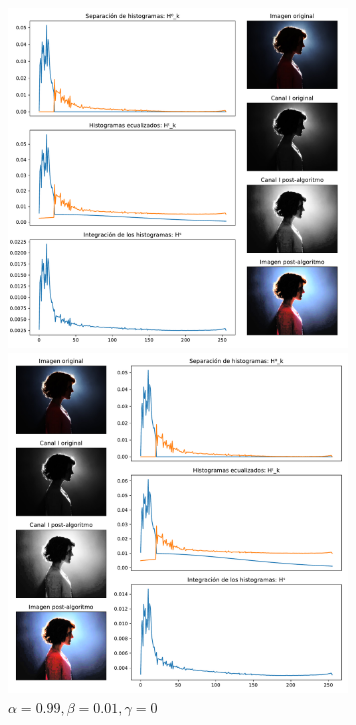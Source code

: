 \begin{figure}[H]
\begin{minipage}[c]{0.48\linewidth}
  \includegraphics[height=9cm]{imgs/wom-995-005-0.pdf}
  \caption{$\alpha = 0.995, \beta = 0.005, \gamma = 0$}
\end{minipage}
\hfill
\begin{minipage}[c]{0.48\linewidth}
  \includegraphics[height=9cm]{imgs/wom-99-01-0.pdf}
  \caption{$\alpha = 0.99, \beta = 0.01, \gamma = 0$}
\end{minipage}%
\end{figure}

